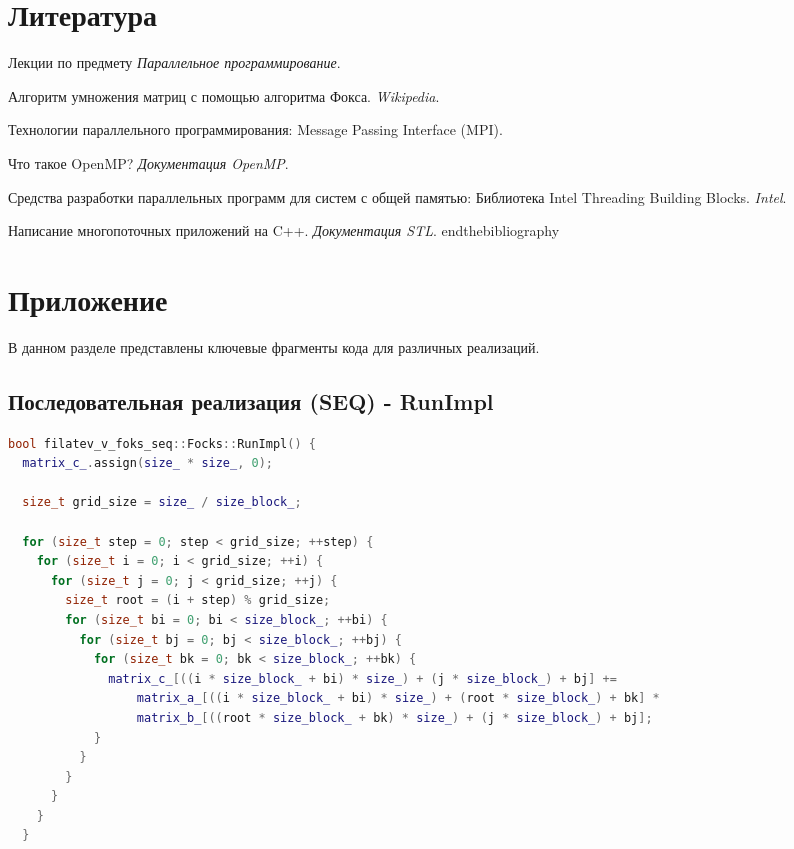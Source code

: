 \documentclass[12pt]{article}
\begin{document}
\newpage
\section{Литература}
\begin{thebibliography}{99}
    Лекции по предмету \textit{Параллельное программирование}.
    
    Алгоритм умножения матриц с помощью алгоритма Фокса. \textit{Wikipedia}. 
    
    Технологии параллельного программирования: Message Passing Interface (MPI).
    
    Что такое OpenMP? \textit{Документация OpenMP}.
    
    Средства разработки параллельных программ для систем с общей памятью: Библиотека Intel Threading Building Blocks. \textit{Intel}.
    
    Написание многопоточных приложений на C++. \textit{Документация STL}.
end{thebibliography}


\newpage
\section{Приложение}

В данном разделе представлены ключевые фрагменты кода для различных реализаций.

\subsection{Последовательная реализация (SEQ) - RunImpl}
\begin{lstlisting}[language=C++]
bool filatev_v_foks_seq::Focks::RunImpl() {
  matrix_c_.assign(size_ * size_, 0);

  size_t grid_size = size_ / size_block_;

  for (size_t step = 0; step < grid_size; ++step) {
    for (size_t i = 0; i < grid_size; ++i) {
      for (size_t j = 0; j < grid_size; ++j) {
        size_t root = (i + step) % grid_size;
        for (size_t bi = 0; bi < size_block_; ++bi) {
          for (size_t bj = 0; bj < size_block_; ++bj) {
            for (size_t bk = 0; bk < size_block_; ++bk) {
              matrix_c_[((i * size_block_ + bi) * size_) + (j * size_block_) + bj] +=
                  matrix_a_[((i * size_block_ + bi) * size_) + (root * size_block_) + bk] *
                  matrix_b_[((root * size_block_ + bk) * size_) + (j * size_block_) + bj];
            }
          }
        }
      }
    }
  }


\end{lstlisting}
\end{thebibliography}
\end{document}
